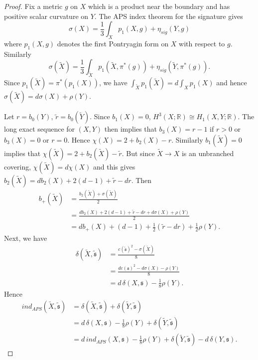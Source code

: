 \documentclass{amsart}
\theoremstyle{definition}
\theoremstyle{remark}
\numberwithin{equation}{section}
\begin{document}
\begin{proof}
Fix a metric $g$ on $X$ which is a product near the boundary and has positive scalar curvature on $Y$. The APS index theorem for the signature gives
\[
\sigma(X) = \frac{1}{3} \int_X p_1(X,g) + \eta_{sig}(Y,g)
\]
where $p_1(X,g)$ denotes the first Pontryagin form on $X$ with respect to $g$. Similarly
\[
\sigma(\widetilde{X}) = \frac{1}{3} \int_{\widetilde{X}} p_1(\widetilde{X}, \pi^*(g)) + \eta_{sig}(\widetilde{Y},\pi^*(g)).
\]
Since $p_1(\widetilde{X}) = \pi^*(p_1(X))$, we have $\int_{\widetilde{X}} p_1(\widetilde{X}) = d \int_X p_1(X)$ and hence $\sigma(\widetilde{X}) = d \sigma(X) + \rho(Y)$.

Let $r = b_0(Y)$, $\widetilde{r} = b_0(\widetilde{Y})$. Since $b_1(X) = 0$, $H^3(X ; \mathbb{R}) \cong H_1(X , Y ; \mathbb{R})$. The long exact sequence for $(X,Y)$ then implies that $b_3(X) = r-1$ if $r > 0$ or $b_3(X) = 0$ or $r=0$. Hence $\chi(X) = 2 + b_2(X) - r$. Similarly $b_1(\widetilde{X}) = 0$ implies that $\chi(\widetilde{X}) = 2 + b_2(\widetilde{X}) - \widetilde{r}$. But since $\widetilde{X} \to X$ is an unbranched covering, $\chi(\widetilde{X}) = d \chi(X)$ and this gives $b_2(\widetilde{X}) = d b_2(X) + 2(d-1) + \widetilde{r} - dr$. Then
\begin{align*}
b_+(\widetilde{X}) &= \frac{ b_2(\widetilde{X}) + \sigma(\widetilde{X}) }{2} \\
&= \frac{ d b_2(X) + 2(d-1) + \widetilde{r} - dr + d \sigma(X) + \rho(Y) }{2} \\
&= d b_+(X) + (d-1) + \frac{1}{2}(\widetilde{r} - dr) + \frac{1}{2}\rho(Y).
\end{align*}
Next, we have
\begin{align*}
\delta( \widetilde{X} , \widetilde{\mathfrak{s}}) &= \frac{ c(\widetilde{\mathfrak{s}})^2 - \sigma(\widetilde{X}) }{8} \\
&= \frac{ d c(\mathfrak{s})^2 - d \sigma(X) - \rho(Y) }{8} \\
&= d \, \delta(X , \mathfrak{s}) - \frac{1}{8}\rho(Y).
\end{align*}
Hence
\begin{align*}
ind_{APS}( \widetilde{X} , \widetilde{\mathfrak{s}}) &= \delta(\widetilde{X} , \widetilde{\mathfrak{s}}) + \delta(\widetilde{Y} , \widetilde{\mathfrak{s}}) \\
&= d \, \delta(X , \mathfrak{s}) - \frac{1}{8}\rho(Y) + \delta(\widetilde{Y} , \widetilde{\mathfrak{s}}) \\
&= d \, ind_{APS}(X , \mathfrak{s}) - \frac{1}{8}\rho(Y) + \delta(\widetilde{Y} , \widetilde{\mathfrak{s}}) - d \, \delta(Y , \mathfrak{s}).

\end{align*}
\end{proof}
\end{document}
